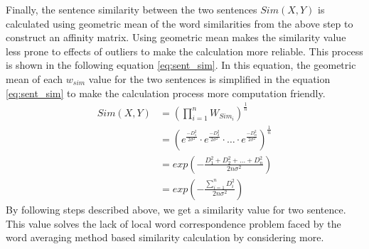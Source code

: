 Finally, the sentence similarity between the two sentences $Sim(X,Y)$ is calculated using geometric mean of the word similarities from the above step to construct an affinity matrix. Using geometric mean makes the similarity value less prone to effects of outliers to make the calculation more reliable. This process is shown in the following equation \ref{eq:sent_sim}. In this equation, the geometric mean of each $w_{sim}$ value for the two sentences is simplified in the equation \ref{eq:sent_sim} to make the calculation process more computation friendly. 
\begin{equation}\label{eq:sent_sim}
    \begin{split}
        Sim(X,Y)
        &=  \left(
                \prod_{i=1}^nW_{Sim_i}
            \right)^{\frac{1}{n}}\\
        &=  \left(
                e^{\frac{-D_1^2}{2\sigma^2}}\cdot
                e^{\frac{-D_2^2}{2\sigma^2}}\cdot
                    \ldots \cdot
                e^{\frac{-D_n^2}{2\sigma^2}}
            \right)^\frac{1}{n}\\
        &=  exp\left(
                -\frac{D_1^2+D_2^2+\ldots+D_n^2}{2n\sigma^2}
            \right)\\
        &=  exp\left(
                -\frac{\sum_{i=1}^nD_i^2}{2n\sigma^2}
            \right)
    \end{split}
\end{equation}
By following steps described above, we get a similarity value for two sentence. This value solves the lack of local word correspondence problem faced by the word averaging method based similarity calculation \cite{roychowdhury-etal-2022-spectral-base} by considering more.

